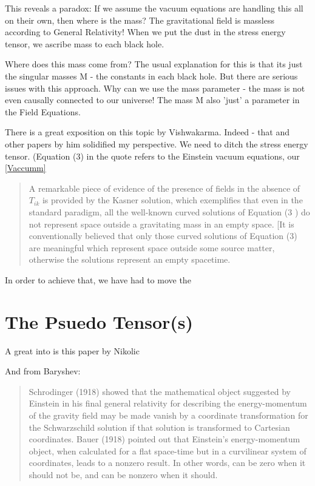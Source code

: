 \documentclass[../rzero]{subfiles}
\begin{document}
This reveals a paradox: If we assume the vacuum equations are handling this all on their own, then where is the mass? The gravitational field is massless according to General Relativity! When we put the dust in the stress energy tensor, we ascribe mass to each black hole. 

Where does this mass come from? The usual explanation for this is that its just the singular masses M - the constants in each black hole. But there are serious issues with this approach. Why can we use the mass parameter - the mass is not even causally connected to our universe! The mass M also 'just' a parameter in the Field Equations.

There is a great exposition on this topic by Vishwakarma\cite{vishwakarmaEinsteinCriticalPerspective2016}. Indeed - that and other papers by him solidified my perspective. We need to ditch the stress energy tensor. (Equation (3) in the quote refers to the Einstein vacuum equations, our \ref{Vaccumm}

\begin{quotation}
	A remarkable piece of evidence of the presence of fields in the absence of $T_{ik}$ is provided by the Kasner solution, which exemplifies that even in the standard paradigm, all the well-known curved solutions of Equation (3 ) do not represent space outside a gravitating mass in an empty space. [It is conventionally believed that only those curved solutions of Equation (3) are meaningful which represent space outside some source matter, otherwise the solutions represent an empty spacetime.
\end{quotation}


In order to achieve that, we have had to move the  


\section{The Psuedo Tensor(s)}

A great into is this paper by Nikolic\cite{nikolicTrivialSolutionGravitational2014}



And from Baryshev\cite{08092323EnergyMomentumGravitational}:
\begin{quotation}
	Schrodinger (1918) showed that the mathematical object suggested by Einstein in his final general relativity for describing the energy-momentum of the gravity field may be made vanish by a coordinate transformation for the Schwarzschild solution if that solution is transformed to Cartesian coordinates. Bauer (1918) pointed out that Einstein's energy-momentum object, when calculated for a flat space-time but in a  curvilinear system of coordinates, leads to a nonzero result. In other words, can be zero when it should not be, and can be nonzero when it should.
\end{quotation}
\end{document}
